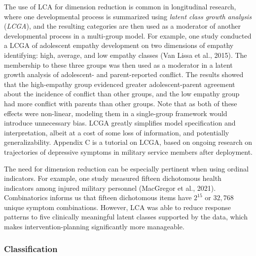 \documentclass[
  ,man,floatsintext]{apa6}
\begin{document}
The use of LCA for dimension reduction is common in longitudinal research,
where one developmental process is summarized using \emph{latent class growth analysis} (\emph{LCGA}),
and the resulting categories are then used as a moderator of another developmental process in a multi-group model.
For example, one study conducted a LCGA of adolescent empathy development on two dimensions of empathy identifying: high, average, and low empathy classes (Van Lissa et al., 2015).
The membership to these three groups was then used as a moderator in a latent growth analysis of adolescent- and parent-reported conflict.
The results showed that the high-empathy group evidenced greater adolescent-parent agreement about the incidence of conflict than other groups,
and the low empathy group had more conflict with parents than other groups.
Note that as both of these effects were non-linear,
modeling them in a single-group framework would introduce unnecessary bias.
LCGA greatly simplifies model specification and interpretation,
albeit at a cost of some loss of information, and potentially generalizability.
Appendix C is a tutorial on LCGA,
based on ongoing research on trajectories of depressive symptoms in military service members after deployment.

The need for dimension reduction can be especially pertinent when using ordinal indicators.
For example, one study measured
fifteen dichotomous health indicators among injured military personnel (MacGregor et al., 2021).
Combinatorics informs us that fifteen
dichotomous items have \(2^{15}\) or \(32,768\) unique symptom combinations.
However, LCA was able to reduce response patterns to five clinically meaningful latent classes supported by the data,
which makes intervention-planning significantly more manageable.

\hypertarget{classification}{%
\subsubsection{Classification}\label{classification}}
\end{document}
